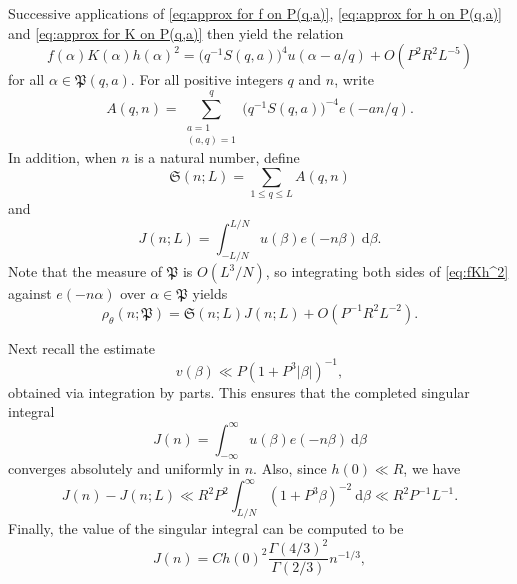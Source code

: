 \documentclass[12pt,english,reqno]{amsart}
\theoremstyle{definition}
\theoremstyle{remark}
\numberwithin{equation}{section}
\numberwithin{equation}{section}
\numberwithin{figure}{section}
\theoremstyle{plain}
\theoremstyle{plain}
\theoremstyle{plain}
\theoremstyle{plain}
\numberwithin{equation}{section}
\numberwithin{thm}{section}
\begin{document}
Successive applications of \eqref{eq:approx for f on P(q,a)}, \eqref{eq:approx for h on P(q,a)}
and \eqref{eq:approx for K on P(q,a)} then yield the relation
\begin{equation}
f(\alpha)K(\alpha)h(\alpha)^{2}=\Big(q^{-1}S(q,a)\Big)^{4}u(\alpha-a/q)+O(P^{2}R^{2}L^{-5})\label{eq:fKh^2}\end{equation}
for all $\alpha\in\mathfrak{P}(q,a)$. For all positive integers $q$
and $n$, write
\begin{equation}
A(q,n)=\sum_{\substack{a=1\\
(a,q)=1}
}^{q}\Big(q^{-1}S(q,a)\Big)^{-4}e(-an/q).\label{eq:A(q,n)}\end{equation}
In addition, when $n$ is a natural number, define
\begin{equation}
\mathfrak{S}(n;L)=\sum_{1\leq q\leq L}A(q,n)\label{eq:truncated singular series}\end{equation}
and
\begin{equation}
J(n;L)=\int_{-L/N}^{L/N}u(\beta)e(-n\beta)\mathrm{\: d}\beta.\label{eq:truncated singular integral}\end{equation}
Note that the measure of $\mathfrak{P}$ is $O(L^{3}/N)$, so integrating
both sides of \eqref{eq:fKh^2} against $e(-n\alpha)$ over $\alpha\in\mathfrak{P}$
yields
\begin{equation}
\rho_{\theta}(n;\mathfrak{P})=\mathfrak{S}(n;L)J(n;L)+O(P^{-1}R^{2}L^{-2}).\label{eq:truncated asymptotic for existence}\end{equation}
\par Next recall the estimate
\begin{equation}
v(\beta)\ll P(1+P^{3}|\beta|)^{-1},\label{eq:estimate for v(beta)}\end{equation}
obtained via integration by parts. This ensures that the completed
singular integral
\begin{equation}
J(n)=\int_{-\infty}^{\infty}u(\beta)e(-n\beta)\:\mathrm{d}\beta\label{eq:J(n)}\end{equation}
converges absolutely and uniformly in $n$. Also, since $h(0)\ll R$,
we have
\begin{equation}
J(n)-J(n;L)\ll R^{2}P^{2}\int_{L/N}^{\infty}(1+P^{3}\beta)^{-2}\:\mathrm{d}\beta\ll R^{2}P^{-1}L^{-1}.\label{eq:tail of singular integral}\end{equation}
Finally, the value of the singular integral can be computed to be
\begin{equation}
J(n)=Ch(0)^{2}\frac{\Gamma(4/3)^{2}}{\Gamma(2/3)}n^{-1/3},\label{eq:value of J(n)}\end{equation}
\end{document}
